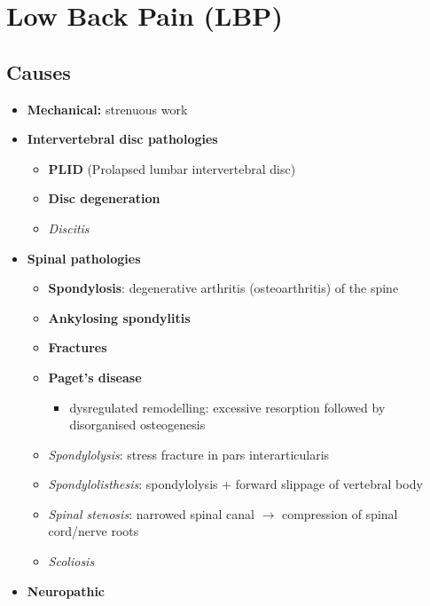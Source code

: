 \documentclass[
  12pt,
]{memoir}
\providecommand{\tightlist}{%
  \setlength{\itemsep}{0pt}\setlength{\parskip}{0pt}}
\begin{document}
\pagebreak

\hypertarget{low-back-pain-lbp}{%
\section{Low Back Pain (LBP)}\label{low-back-pain-lbp}}

\hypertarget{causes}{%
\subsection{Causes}\label{causes}}

\begin{itemize}
\tightlist
\item
  \textbf{Mechanical:} strenuous work
\item
  \textbf{Intervertebral disc pathologies}

  \begin{itemize}
  \tightlist
  \item
    \textbf{PLID} (Prolapsed lumbar intervertebral disc)
  \item
    \textbf{Disc degeneration}
  \item
    \emph{Discitis}
  \end{itemize}
\item
  \textbf{Spinal pathologies}

  \begin{itemize}
  \tightlist
  \item
    \textbf{Spondylosis}: degenerative arthritis (osteoarthritis) of the
    spine
  \item
    \textbf{Ankylosing spondylitis}
  \item
    \textbf{Fractures}
  \item
    \textbf{Paget's disease}

    \begin{itemize}
    \tightlist
    \item
      dysregulated remodelling: excessive resorption followed by
      disorganised osteogenesis
    \end{itemize}
  \item
    \emph{Spondylolysis}: stress fracture in pars interarticularis
  \item
    \emph{Spondylolisthesis}: spondylolysis + forward slippage of
    vertebral body
  \item
    \emph{Spinal stenosis}: narrowed spinal canal \(\rightarrow\)
    compression of spinal cord/nerve roots
  \item
    \emph{Scoliosis}
  \end{itemize}
\item
  \textbf{Neuropathic}


\end{itemize}
\end{document}
